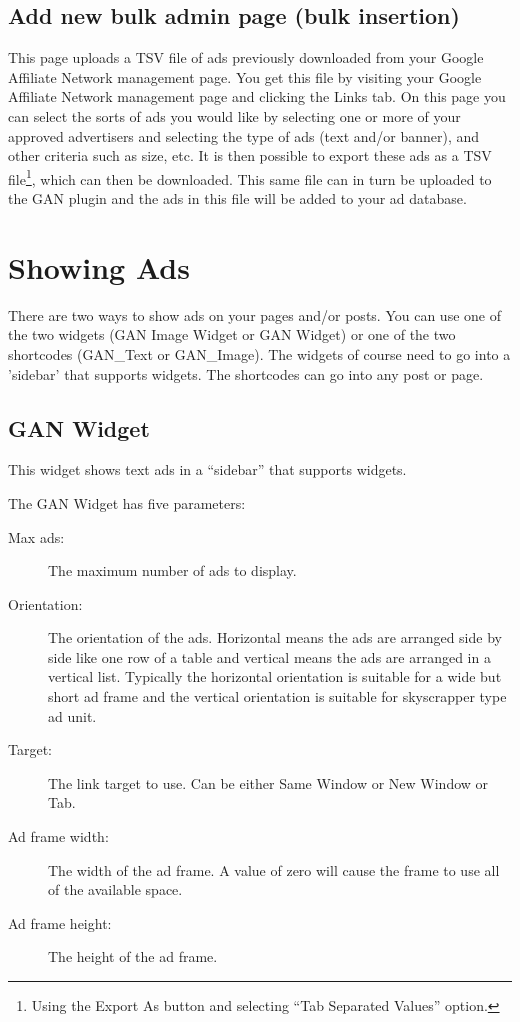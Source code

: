 \documentclass[letterpaper]{article}
\begin{document}
\subsection{Add new bulk admin page (bulk insertion)}
\label{sect:addbulk}

This page uploads a TSV file of ads previously downloaded from your
Google Affiliate Network management page. You get this file by visiting
your Google Affiliate Network management page and clicking the Links
tab. On this page you can select the sorts of ads you would like by
selecting one or more of your approved advertisers and selecting the
type of ads (text and/or banner), and other criteria such as size, etc.
It is then possible to export these ads as a TSV file\footnote{Using
the Export As button and selecting ``Tab Separated Values'' option.},
which can then be downloaded. This same file can in turn be uploaded to
the GAN plugin and the ads in this file will be added to your ad
database.

\section{Showing Ads}

There are two ways to show ads on your pages and/or posts.  You can
use one of the two widgets (GAN Image Widget or GAN Widget) or one of
the two shortcodes (GAN\_Text or GAN\_Image).  The widgets of course need
to go into a 'sidebar' that supports widgets.  The shortcodes can go
into any post or page.

\subsection{GAN Widget}

This widget shows text ads in a ``sidebar'' that supports widgets.

The GAN Widget has five parameters:
\begin{description}
  \item[Max ads:] The maximum number of ads to display.
  \item[Orientation:] The orientation of the ads. Horizontal
means the ads are arranged side by side like one row of a table and
vertical means the ads are arranged in a vertical list. Typically the
horizontal orientation is suitable for a wide but short ad frame and the
vertical orientation is suitable for skyscrapper type ad unit.
  \item[Target:] The link target to use. Can be either Same 
Window or New Window or Tab.
  \item[Ad frame width:] The width of the ad frame. A value
of zero will cause the frame to use all of the available space.
  \item[Ad frame height:] The height of the ad frame.
\end{description}
\end{document}
